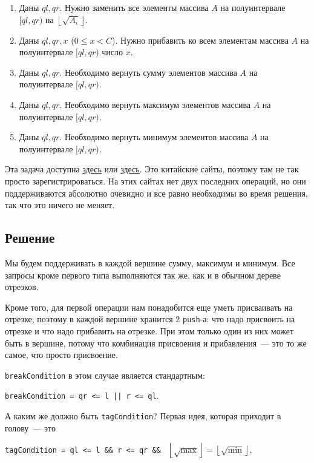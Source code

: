 \begin{enumerate}
    \item Даны $ql, qr$. Нужно заменить все элементы массива $A$ на полуинтервале $[ql, qr)$ на $\left\lfloor \sqrt{A_i} \right\rfloor$.
    \item Даны $ql, qr, x$ ($0 \le x < C$). Нужно прибавить ко всем элементам массива $A$ на полуинтервале $[ql, qr)$ число $x$.
    \item Даны $ql, qr$. Необходимо вернуть сумму элементов массива $A$ на полуинтервале $[ql, qr)$.
    \item Даны $ql, qr$. Необходимо вернуть максимум элементов массива $A$ на полуинтервале $[ql, qr)$.
    \item Даны $ql, qr$. Необходимо вернуть минимум элементов массива $A$ на полуинтервале $[ql, qr)$.
\end{enumerate}

Эта задача доступна \href{https://vjudge.net/problem/HDU-5828}{здесь} или \href{http://acm.hdu.edu.cn/showproblem.php?pid=5828}{здесь}. Это китайские сайты, поэтому там не так просто зарегистрироваться.
На этих сайтах нет двух последних операций, но они поддерживаются абсолютно очевидно и все равно необходимы во время решения, так что это ничего не меняет.

\subsection{Решение}

Мы будем поддерживать в каждой вершине сумму, максимум и минимум. Все запросы кроме первого типа выполняются так же, как и в обычном дереве отрезков.

Кроме того, для первой операции нам понадобится еще уметь присваивать на отрезке, поэтому в каждой вершине хранится $2$ \verb+push+-а: что надо присвоить на отрезке и что надо прибавить на отрезке. При этом только один из них может быть в вершине, потому что комбинация присвоения и прибавления~--- это то же самое, что просто присвоение.

\verb+breakCondition+ в этом случае является стандартным:

\verb+breakCondition = qr <= l || r <= ql+.

А каким же должно быть \verb+tagCondition+? Первая идея, которая приходит в голову~--- это

\verb+tagCondition = ql <= l && r <= qr && + $\left\lfloor \sqrt{\max} \right\rfloor = \left\lfloor \sqrt{\min} \right\rfloor$,

